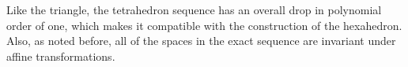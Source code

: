 Like the triangle, the tetrahedron sequence has an overall drop in polynomial order of one, which makes it compatible with the construction of the hexahedron.
Also, as noted before, all of the spaces in the exact sequence are invariant under affine transformations. 



